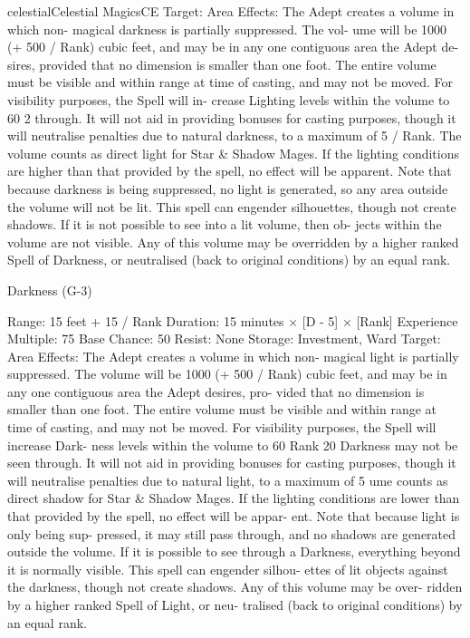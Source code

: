 \begin{College}[1.3]{celestial}{Celestial Magics}{CE}
Target: Area 
Effects: The Adept creates a volume in which non-
magical  darkness  is  partially  suppressed.  The  vol-
ume  will  be  1000  (+  500  /  Rank)  cubic  feet,  and 
may  be  in  any  one  contiguous  area  the  Adept  de-
sires,  provided  that  no  dimension  is  smaller  than 
one  foot.  The  entire  volume  must  be  visible  and 
within  range  at  time  of  casting,  and  may  not  be 
moved.  For  visibility  purposes,  the  Spell  will  in-
crease Lighting levels within the volume to 60%
2%
through.  It  will  not  aid  in  providing  bonuses  for 
casting purposes, though it will neutralise penalties 
due to natural darkness, to a maximum of 5%
/  Rank.  The  volume  counts  as direct  light  for  Star 
\&  Shadow  Mages.  If  the  lighting  conditions  are 
higher  than  that  provided  by  the  spell,  no  effect 
will  be  apparent.  Note  that  because  darkness  is 
being suppressed, no light is generated, so any area 
outside  the  volume  will  not  be  lit.  This  spell  can 
engender silhouettes, though not create shadows. If 
it is not possible to see into a lit volume, then ob-
jects within the volume are not visible. Any of this 
volume  may  be  overridden  by  a  higher  ranked 
Spell  of  Darkness,  or  neutralised  (back  to  original 
conditions) by an equal rank. 

Darkness (G-3) 

Range: 15 feet + 15 / Rank 
Duration: 15 minutes × [D - 5] × [Rank] 
Experience Multiple: 75 
Base Chance: 50%
Resist: None 
Storage: Investment, Ward 
Target: Area 
Effects: The Adept creates a volume in which non-
magical  light  is  partially  suppressed.  The  volume 
will be 1000 (+ 500 / Rank) cubic feet, and may be 
in any one contiguous area the Adept desires, pro-
vided  that  no  dimension  is  smaller  than  one  foot. 
The entire volume must be visible and within range 
at  time  of  casting,  and  may  not  be  moved.  For 
visibility  purposes,  the  Spell  will  increase  Dark-
ness levels within the volume to 60%
Rank 20 Darkness may not be seen through. It will 
not  aid  in  providing  bonuses  for  casting  purposes, 
though  it  will  neutralise  penalties  due  to  natural 
light, to a maximum of 5%
ume  counts  as  direct  shadow  for  Star  \&  Shadow 
Mages.  If  the  lighting  conditions  are  lower  than 
that provided by the spell, no effect will be appar-
ent.  Note  that  because  light  is  only  being  sup-
pressed, it may still pass through, and no shadows 
are generated outside the volume. If it is possible to 
see  through  a  Darkness,  everything  beyond  it  is 
normally  visible.  This  spell  can  engender  silhou-
ettes of lit objects against the darkness, though not 
create  shadows.  Any  of  this  volume  may  be  over-
ridden  by  a  higher  ranked  Spell  of  Light,  or  neu-
tralised  (back  to  original  conditions)  by  an  equal 
rank. 


\end{College}
